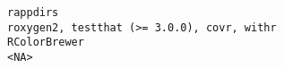 \documentclass[
  letterpaper,
  DIV=11,
  numbers=noendperiod]{scrreprt}
\begin{document}
\begin{verbatim}
rappdirs                                                                                                                                                                                                                                                                                                                                                                                                                                                                                                                                                                                                                                                                                                                                                                                                                                                                                                                                                                                                                                                                                                                                                                                                                                                           roxygen2, testthat (>= 3.0.0), covr, withr
RColorBrewer                                                                                                                                                                                                                                                                                                                                                                                                                                                                                                                                                                                                                                                                                                                                                                                                                                                                                                                                                                                                                                                                                                                                                                                                                                                                                             <NA>

\end{verbatim}
\end{document}
